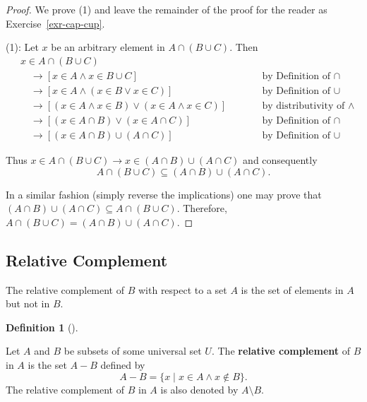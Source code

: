 \documentclass[
  letterpaper,
  10pt,
  reqno,
  twopage,
  openany]{book}
\theoremstyle{plain}
\theoremstyle{definition}
\theoremstyle{definition}
\newtheorem{definition}{Definition}[chapter]
\theoremstyle{definition}
\theoremstyle{plain}
\theoremstyle{plain}
\theoremstyle{remark}
\begin{document}
\begin{proof}

We prove (1) and leave the remainder of the proof for the reader as
Exercise~\ref{exr-cap-cup}.

(1): Let \(x\) be an arbitrary element in \(A\cap (B \cup C).\) Then
\begin{align*}
& x\in A\cap (B \cup C) & \qquad & \\
& \quad \rightarrow [ x\in A \land x\in B\cup C ] & &  \text{by Definition of $\cap$} \\
& \quad \rightarrow [ x\in A \land (x\in B \lor x\in C) ]& &  \text{by Definition of $\cup$} \\
& \quad \rightarrow [ (x\in A \land x\in B) \lor (x\in A \land x\in C) ] & &  \text{by distributivity of $\land$} \\
& \quad \rightarrow [ (x\in A \cap B) \lor (x\in A \cap C) ] & &  \text{by Definition of $\cap$} \\
& \quad \rightarrow [ (x\in A \cap B) \cup (A \cap C) ] & &  \text{by Definition of $\cup$} 
\end{align*}

Thus \(x\in A\cap (B \cup C) \rightarrow x\in (A\cap B)\cup (A\cap C)\)
and consequently \[
A\cap (B \cup C) \subseteq (A\cap B)\cup (A\cap C).
\]

In a similar fashion (simply reverse the implications) one may prove
that \((A\cap B)\cup (A\cap C) \subseteq A\cap (B \cup C).\) Therefore,
\(A\cap (B \cup C)=(A\cap B)\cup (A\cap C).\)

\end{proof}

\hypertarget{relative-complement}{%
\subsection{Relative Complement}\label{relative-complement}}

The relative complement of \(B\) with respect to a set \(A\) is the set
of elements in \(A\) but not in \(B.\)

\leavevmode{}%
\begin{definition}[]\label{def-relative-complement}

Let \(A\) and \(B\) be subsets of some universal set \(U.\) The
 \textbf{relative complement} of \(B\) in
\(A\) is the set \(A-B\) defined by \[
A-B =\{x\mid x\in A \land x\notin B\}.
\] The relative complement of \(B\) in \(A\) is also denoted by
\(A\setminus B.\)

\end{definition}
\end{document}

